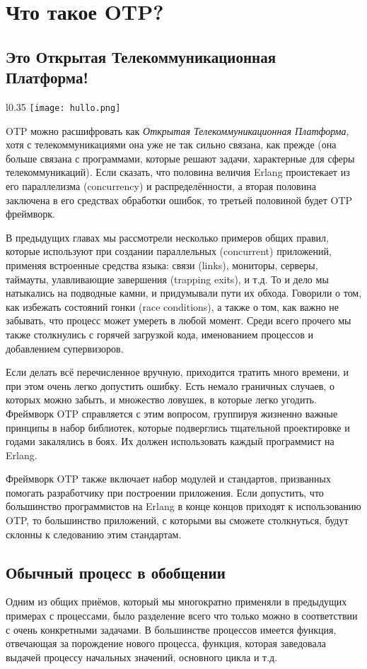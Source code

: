 \chapter{Что такое OTP?}
\label{what-is-otp}
\section{Это Открытая Телекоммуникационная Платформа!}
\label{its-the-open-telecom-platform}
\begin{wrapfigure}{l}{0.35\linewidth}
    \texttt{[image: hullo.png]}
\end{wrapfigure}
OTP можно расшифровать как \emph{Открытая Телекоммуникационная Платформа}, хотя с телекоммуникациями она уже не так сильно связана, как прежде (она больше связана с программами, которые решают задачи, характерные для сферы телекоммуникаций).
Если сказать, что половина величия Erlang проистекает из его параллелизма (concurrency) и распределённости, а вторая половина заключена в его средствах обработки ошибок, то третьей половиной будет OTP фреймворк.

В предыдущих главах мы рассмотрели несколько примеров общих правил, которые используют при создании параллельных (concurrent) приложений, применяя встроенные средства языка: связи (links), мониторы, серверы, таймауты, улавливающие завершения (trapping exits), и т.д.
То и дело мы натыкались на подводные камни, и придумывали пути их обхода.
Говорили о том, как избежать состояний гонки (race conditions), а также о том, как важно не забывать, что процесс может умереть в любой момент.
Среди всего прочего мы также столкнулись с горячей загрузкой кода, именованием процессов и добавлением супервизоров.

Если делать всё перечисленное вручную, приходится тратить много времени, и при этом очень легко допустить ошибку.
Есть немало граничных случаев, о которых можно забыть, и множество ловушек, в которые легко угодить.
Фреймворк OTP справляется с этим вопросом, группируя жизненно важные принципы в набор библиотек, которые подверглись тщательной проектировке и годами закалялись в боях.
Их должен использовать каждый программист на Erlang.

Фреймворк OTP также включает набор модулей и стандартов, призванных помогать разработчику при построении приложения.
Если допустить, что большинство программистов на Erlang в конце концов приходят к использованию OTP, то большинство приложений, с которыми вы сможете столкнуться, будут склонны к следованию этим стандартам. 
\section{Обычный процесс в обобщении}
\label{the-common-process-abstracted}
Одним из общих приёмов, который мы многократно применяли в предыдущих примерах с процессами, было разделение всего что только можно в соответствии с очень конкретными задачами.
В большинстве процессов имеется функция, отвечающая за порождение нового процесса, функция, которая заведовала выдачей процессу начальных значений, основного цикла и т.д.

